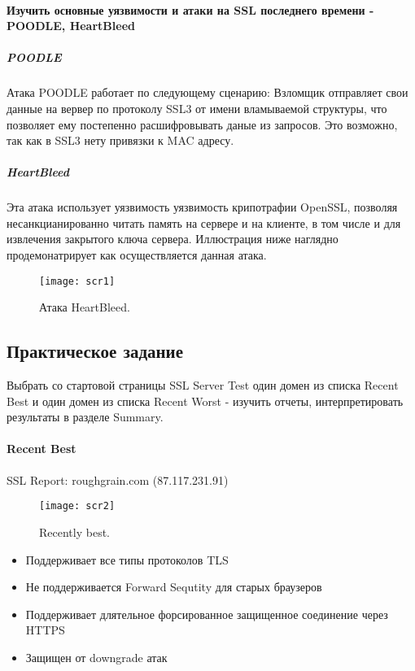 \documentclass{article}
\begin{document}
\paragraph{Изучить основные уязвимости и атаки на SSL последнего времени - POODLE, HeartBleed}
\subparagraph{POODLE}
Атака POODLE работает по следующему сценарию: Взломщик отправляет свои данные на вервер по протоколу SSL3 от имени вламываемой структуры, что позволяет ему постепенно расшифровывать даные из запросов. Это возможно, так как в SSL3 нету привязки к MAC адресу.

\subparagraph{HeartBleed}
Эта атака использует уязвимость уязвимость крипотрафии OpenSSL, позволяя несанкцианированно читать память на сервере и на клиенте, в том числе и для извлечения закрытого ключа сервера. Иллюстрация ниже наглядно продемонатрирует как осуществляется данная атака.

\begin{figure}[h!]
	\centering
	\texttt{[image: scr1]}
	\caption{Атака HeartBleed.}
\end{figure}


\subsection{Практическое задание}
Выбрать со стартовой страницы SSL Server Test один домен из списка Recent Best и один домен из списка Recent Worst - изучить отчеты, интерпретировать результаты в разделе Summary. 



\paragraph{Recent Best}
SSL Report: roughgrain.com (87.117.231.91)
\begin{figure}[h!]
	\centering
	\texttt{[image: scr2]}
	\caption{Recently best.}
\end{figure}
\begin{itemize}
	\item Поддерживает все типы протоколов TLS
	\item Не поддерживается Forward Sequtity для старых браузеров
	\item Поддерживает длятельное форсированное защищенное соединение через  HTTPS
	\item Защищен от downgrade атак
\end{itemize}
\clearpage
\end{document}
